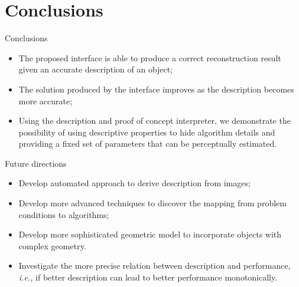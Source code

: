 \documentclass[10pt]{beamer}
\begin{document}
\section{Conclusions}
\begin{frame}{Conclusions}

\begin{exampleblock}{}

\begin{itemize}
\item The proposed interface is able to produce a correct reconstruction result given an accurate description of an object;
\item The solution produced by the interface improves as the description becomes more accurate;
\item Using the description and proof of concept interpreter, we demonstrate the possibility of using descriptive properties to hide algorithm details and providing a fixed set of parameters that can be perceptually estimated.
\end{itemize}

\end{exampleblock}

\end{frame}

\begin{frame}{Future directions}

\begin{exampleblock}{}

\begin{itemize}
\item Develop automated approach to derive description from images;
\item Develop more advanced techniques to discover the mapping from problem conditions to algorithms;
\item Develop more sophisticated geometric model to incorporate objects with complex geometry.
\item Investigate the more precise relation between description and performance, \emph{i.e.,} if better description can lead to better performance monotonically.
\end{itemize}

\end{exampleblock}

\end{frame}
\end{document}
